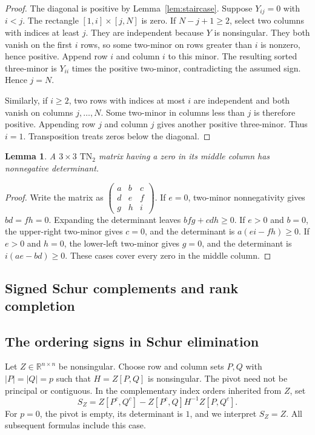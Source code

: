 \documentclass[10pt,a4paper]{article}
\newtheorem{lemma}[theorem]{Lemma}
\theoremstyle{definition}
\theoremstyle{remark}
\numberwithin{equation}{section}
\newcommand{\R}{\mathbb R}
\begin{document}
\begin{proof}
The diagonal is positive by Lemma~\ref{lem:staircase}.
Suppose $Y_{ij}=0$ with $i<j$. The rectangle
$[1,i]\times[j,N]$ is zero. If $N-j+1\geq2$, select two columns
with indices at least $j$. They are independent because $Y$ is
nonsingular. They both vanish on the first $i$ rows, so some
two-minor on rows greater than $i$ is nonzero, hence positive.
Append row $i$ and column $i$ to this minor. The resulting sorted
three-minor is $Y_{ii}$ times the positive two-minor, contradicting
the assumed sign. Hence $j=N$.

Similarly, if $i\geq2$, two rows with indices at most $i$ are
independent and both vanish on columns $j,\ldots,N$. Some two-minor
in columns less than $j$ is therefore positive. Appending row $j$
and column $j$ gives another positive three-minor. Thus $i=1$.
Transposition treats zeros below the diagonal.
\end{proof}

\begin{lemma}\label{lem:middle}
A $3\times3$ $\mathrm{TN}_2$ matrix having a zero in its middle
column has nonnegative determinant.
\end{lemma}

\begin{proof}
Write the matrix as
$\left(\begin{smallmatrix}a&b&c\\d&e&f\\g&h&i\end{smallmatrix}\right)$.
If $e=0$, two-minor nonnegativity gives $bd=fh=0$. Expanding the
determinant leaves $bfg+cdh\geq0$. If $e>0$ and $b=0$, the
upper-right two-minor gives $c=0$, and the determinant is
$a(ei-fh)\geq0$. If $e>0$ and $h=0$, the lower-left two-minor
gives $g=0$, and the determinant is $i(ae-bd)\geq0$. These cases
cover every zero in the middle column.
\end{proof}


\subsection{Signed Schur complements and rank completion}\label{sec:schur}

\subsection{The ordering signs in Schur elimination}

Let $Z\in\R^{n\times n}$ be nonsingular. Choose row and column
sets $P,Q$ with $|P|=|Q|=p$ such that $H=Z[P,Q]$ is
nonsingular. The pivot need not be principal or contiguous.
In the complementary index orders inherited from $Z$, set
\begin{equation}\label{eq:schur}
 S_Z=Z[P^c,Q^c]-Z[P^c,Q]H^{-1}Z[P,Q^c].
\end{equation}
For $p=0$, the pivot is empty, its determinant is $1$, and we
interpret $S_Z=Z$. All subsequent formulas include this case.
\end{document}
